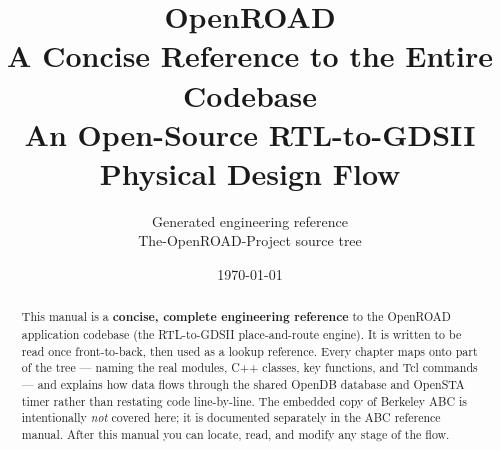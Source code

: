 \documentclass[11pt,oneside]{report}
\title{\Huge\textbf{OpenROAD}\\[0.4em]
       \LARGE A Concise Reference to the Entire Codebase\\[0.6em]
       \large An Open-Source RTL-to-GDSII Physical Design Flow}
\author{Generated engineering reference \\ \small The-OpenROAD-Project source tree}
\date{\today}
\begin{document}
\maketitle

\begin{abstract}
\noindent
This manual is a \textbf{concise, complete engineering reference} to the OpenROAD
application codebase (the RTL-to-GDSII place-and-route engine). It is written to
be read once front-to-back, then used as a lookup reference. Every chapter maps
onto part of the  tree --- naming the real modules, C++ classes,
key functions, and Tcl commands --- and explains how data flows through the
shared OpenDB database and OpenSTA timer rather than restating code
line-by-line. The embedded  copy of Berkeley ABC is intentionally
\emph{not} covered here; it is documented separately in the ABC reference manual.
After this manual you can locate, read, and modify any stage of the flow.
\end{abstract}

\tableofcontents
















\end{document}
